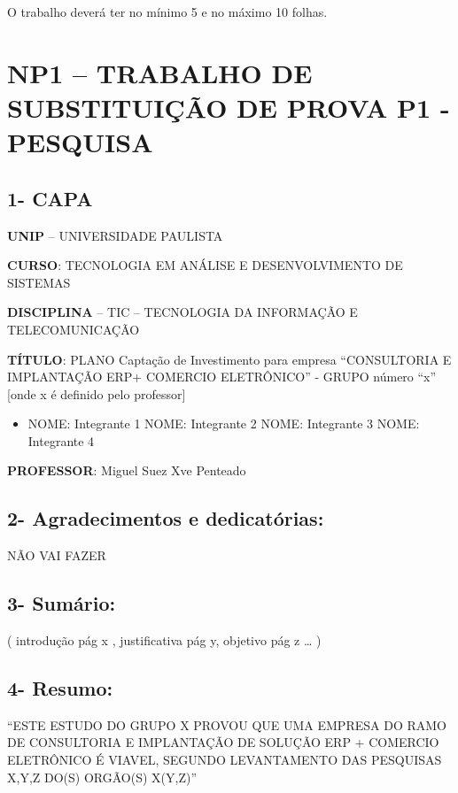 \documentclass[
]{book}
\providecommand{\tightlist}{%
  \setlength{\itemsep}{0pt}\setlength{\parskip}{0pt}}
\begin{document}
O trabalho deverá ter no mínimo 5 e no máximo 10 folhas.

\section{NP1 -- TRABALHO DE SUBSTITUIÇÃO DE PROVA P1 - PESQUISA}\label{np1-trabalho-de-substituiuxe7uxe3o-de-prova-p1---pesquisa}

\subsection{1- CAPA}\label{capa}

\textbf{UNIP} -- UNIVERSIDADE PAULISTA

\textbf{CURSO}: TECNOLOGIA EM ANÁLISE E DESENVOLVIMENTO DE SISTEMAS

\textbf{DISCIPLINA} -- TIC -- TECNOLOGIA DA INFORMAÇÃO E TELECOMUNICAÇÃO

\textbf{TÍTULO}: PLANO Captação de Investimento para empresa ``CONSULTORIA E IMPLANTAÇÃO ERP+ COMERCIO ELETRÔNICO'' - GRUPO número ``x'' {[}onde x é definido pelo professor{]}

\begin{itemize}
\tightlist
\item
  NOME: Integrante 1
  NOME: Integrante 2 NOME: Integrante 3 NOME: Integrante 4
\end{itemize}

\textbf{PROFESSOR}: Miguel Suez Xve Penteado

\subsection{2- Agradecimentos e dedicatórias:}\label{agradecimentos-e-dedicatuxf3rias}

NÃO VAI FAZER

\subsection{3- Sumário:}\label{sumuxe1rio}

( introdução pág x , justificativa pág y, objetivo pág z \ldots{} )

\subsection{4- Resumo:}\label{resumo}

``ESTE ESTUDO DO GRUPO X PROVOU QUE UMA EMPRESA DO RAMO DE CONSULTORIA E IMPLANTAÇÃO DE SOLUÇÃO ERP + COMERCIO ELETRÔNICO É VIAVEL, SEGUNDO LEVANTAMENTO DAS PESQUISAS X,Y,Z DO(S) ORGÃO(S) X(Y,Z)''
\end{document}

